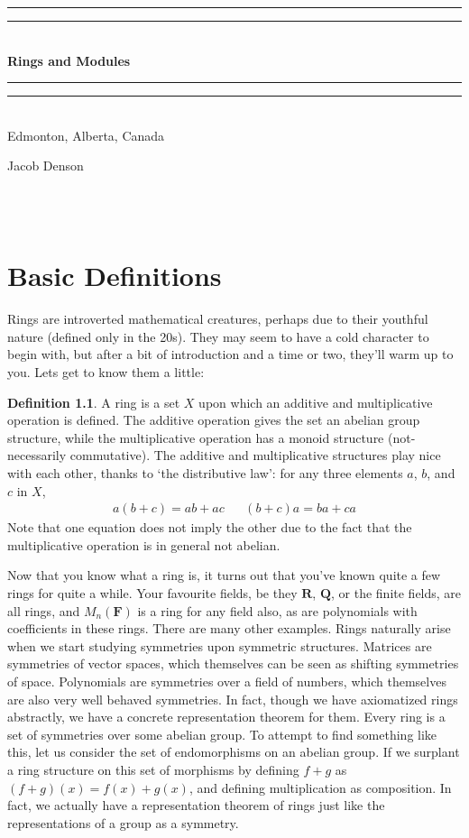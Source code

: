 \documentclass[12pt]{amsbook}
\theoremstyle{definition}
\newtheorem{definition}{Definition}
\newcommand*{\plogo}{\fbox{$\mathcal{JD}$}} %
\newcommand*{\titleGP}{\begingroup %
\centering %
\vspace*{\baselineskip} %

\rule{\textwidth}{1.6pt}\vspace*{-\baselineskip}\vspace*{2pt} %
\rule{\textwidth}{0.4pt}\\[\baselineskip] %

{\bf \Huge Rings and Modules\\[0.3\baselineskip]} %

\rule{\textwidth}{0.4pt}\vspace*{-\baselineskip}\vspace{3.2pt} %
\rule{\textwidth}{1.6pt}\\[\baselineskip] %

\large Edmonton, Alberta, Canada\par %

\vspace*{2\baselineskip} %

{\Huge Jacob Denson\par} %

\vfill %

\plogo \\[0.3\baselineskip] %
{\scshape \the\year} \\[0.3\baselineskip] %

\endgroup}
\begin{document}

\titleGP %

\tableofcontents


\chapter{Basic Definitions}

Rings are introverted mathematical creatures, perhaps due to their youthful nature (defined only in the 20s). They may seem to have a cold character to begin with, but after a bit of introduction and a time or two, they'll warm up to you. Lets get to know them a little:

\begin{definition}
    A ring is a set $X$ upon which an additive and multiplicative operation is defined. The additive operation gives the set an abelian group structure, while the multiplicative operation has a monoid structure (not-necessarily commutative). The additive and multiplicative structures play nice with each other, thanks to `the distributive law': for any three elements $a$, $b$, and $c$ in $X$,
    \begin{align*}
        a(b + c) = ab + ac && (b + c)a = ba + ca
    \end{align*}
    Note that one equation does not imply the other due to the fact that the multiplicative operation is in general not abelian.
\end{definition}

Now that you know what a ring is, it turns out that you've known quite a few rings for quite a while. Your favourite fields, be they $\mathbf{R}$, $\mathbf{Q}$, or the finite fields, are all rings, and $M_n(\mathbf{F})$ is a ring for any field also, as are polynomials with coefficients in these rings. There are many other examples. Rings naturally arise when we start studying symmetries upon symmetric structures. Matrices are symmetries of vector spaces, which themselves can be seen as shifting symmetries of space. Polynomials are symmetries over a field of numbers, which themselves are also very well behaved symmetries. In fact, though we have axiomatized rings abstractly, we have a concrete representation theorem for them. Every ring is a set of symmetries over some abelian group. To attempt to find something like this, let us consider the set of endomorphisms on an abelian group. If we surplant a ring structure on this set of morphisms by defining $f + g$ as $(f + g)(x) = f(x) + g(x)$, and defining multiplication as composition. In fact, we actually have a representation theorem of rings just like the representations of a group as a symmetry.
\end{document}
